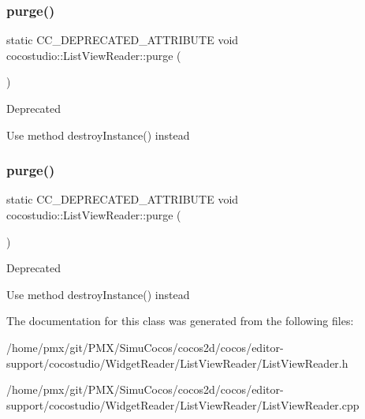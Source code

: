 \subsubsection{\texorpdfstring{purge()}{purge()}\hspace{0.1cm}{\footnotesize\ttfamily [1/2]}}
{\footnotesize\ttfamily static C\+C\+\_\+\+D\+E\+P\+R\+E\+C\+A\+T\+E\+D\+\_\+\+A\+T\+T\+R\+I\+B\+U\+TE void cocostudio\+::\+List\+View\+Reader\+::purge (\begin{DoxyParamCaption}{ }\end{DoxyParamCaption})\hspace{0.3cm}{\ttfamily [static]}}

\begin{DoxyRefDesc}{Deprecated}
\item[\hyperlink{deprecated__deprecated000092}{Deprecated}]Use method destroy\+Instance() instead \end{DoxyRefDesc}
\mbox{\label{classcocostudio_1_1ListViewReader_a20c59e870feb7706d0dd0ebc58f56100}} 
\subsubsection{\texorpdfstring{purge()}{purge()}\hspace{0.1cm}{\footnotesize\ttfamily [2/2]}}
{\footnotesize\ttfamily static C\+C\+\_\+\+D\+E\+P\+R\+E\+C\+A\+T\+E\+D\+\_\+\+A\+T\+T\+R\+I\+B\+U\+TE void cocostudio\+::\+List\+View\+Reader\+::purge (\begin{DoxyParamCaption}{ }\end{DoxyParamCaption})\hspace{0.3cm}{\ttfamily [static]}}

\begin{DoxyRefDesc}{Deprecated}
\item[\hyperlink{deprecated__deprecated000327}{Deprecated}]Use method destroy\+Instance() instead \end{DoxyRefDesc}


The documentation for this class was generated from the following files\+:\begin{DoxyCompactItemize}
\item 
/home/pmx/git/\+P\+M\+X/\+Simu\+Cocos/cocos2d/cocos/editor-\/support/cocostudio/\+Widget\+Reader/\+List\+View\+Reader/List\+View\+Reader.\+h\item 
/home/pmx/git/\+P\+M\+X/\+Simu\+Cocos/cocos2d/cocos/editor-\/support/cocostudio/\+Widget\+Reader/\+List\+View\+Reader/List\+View\+Reader.\+cpp\end{DoxyCompactItemize}
